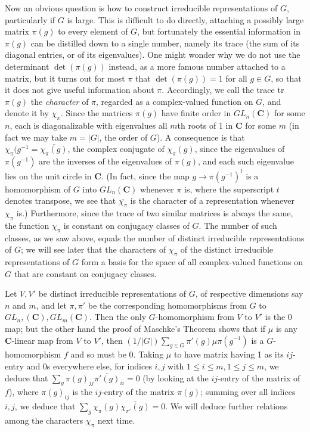 \documentclass[10pt]{article}
\begin{document}
Now an obvious question is how to construct irreducible representations
of $G$, particularly if $G$ is large. This is difficult to do directly,
attaching a possibly large matrix $\pi(g)$ to every element of $G$, but
fortunately the essential information in $\pi(g)$ can be distilled down
to a single number, namely its trace (the sum of its diagonal entries,
or of its eigenvalues). One might wonder why we do not use the
determinant $\det(\pi(g))$ instead, as a more famous number attached to
a matrix, but it turns out for most $\pi$ that $\det(\pi(g)) = 1$ for
all $g\in G$, so that it does not give useful information about $\pi$.
Accordingly, we call the trace tr~$\pi(g)$ the {\sl character} of $\pi$,
regarded as a complex-valued function on $G$, and denote it by
$\chi_\pi$. Since the matrices $\pi(g)$ have finite order in
$GL_n(\mathbf C)$ for some $n$, each is diagonalizable with eigenvalues
all $m$th roots of 1 in $\mathbf C$ for some $m$ (in fact we may take
$m= | G |$, the order of $G$). A consequence is that $\chi_\pi(g^{-1} =
\overline{\chi_\pi(g)}$, the complex conjugate of $\chi_\pi(g)$, since
the eigenvalues of $\pi(g^{-1})$ are the inverses of the eigenvalues of
$\pi(g)$, and each such eigenvalue lies on the unit circle in $\mathbf
C$. (In fact, since the map $g\rightarrow\pi(g^{-1})^t$ is a
homomorphism of $G$ into $GL_n(\mathbf C)$ whenever $\pi$ is, where the
superscript $t$ denotes transpose, we see that $\overline{\chi_{\pi}}$
is the character of a representation whenever $\chi_\pi$ is.)
Furthermore, since the trace of two similar matrices is always the same,
the function $\chi_\pi$ is constant on conjugacy classes of $G$. The
number of such classes, as we saw above, equals the number of distinct
irreducible representations of $G$; we will see later that the
characters of $\chi_\pi$ of the distinct irreducible representations of
$G$ form a basis for the space of all complex-valued functions on $G$
that are constant on conjugacy classes.

Let $V,V'$ be distinct irreducible representations of $G$, of respective
dimensions say $n$ and $m$, and let $\pi,\pi'$ be the corresponding
homomorphisms from $G$ to $GL_n,(\mathbf C), GL_m(\mathbf C)$. Then the
only $G$-homomorphism from $V$ to $V'$ is the 0 map; but the other hand
the proof of Maschke's Theorem shows that if $\mu$ is any $\mathbf
C$-linear map from $V$ to $V'$, then $(1/ | G |)\sum_{g\in G}
\pi'(g)\mu\pi(g^{-1})$ is a $G$-homomorphism $f$ and so must be 0.
Taking $\mu$ to have matrix having 1 as its $ij$-entry and 0s everywhere
else, for indices $i,j$ with $1\le i\le m,1\le j\le m$, we deduce that
$\sum_g \pi(g)_{jj} \overline{\pi'(g)}_{ii} = 0$ (by looking at the
$ij$-entry of the matrix of $f$), where $\pi(g)_{ij}$ is the $ij$-entry
of the matrix $\pi(g)$; summing over all indices $i,j$, we deduce that
$\sum_g \chi_\pi(g) \overline{\chi_{\pi'}(g)} = 0$. We will deduce
further relations among the characters $\chi_\pi$ next time.
\end{document}
